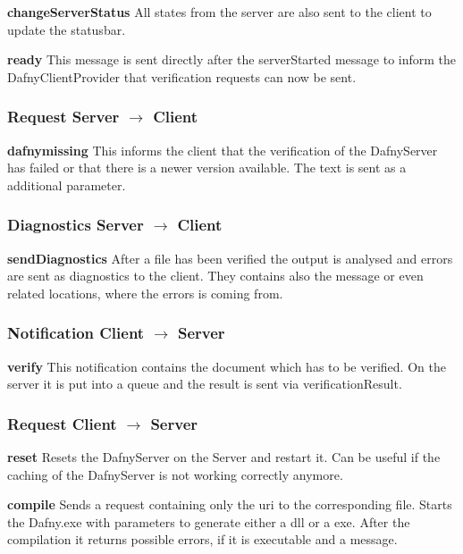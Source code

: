 \textbf{changeServerStatus}
All states from the server are also sent to the client to update the statusbar. \newline

\textbf{ready}
This message is sent directly after the serverStarted message to inform the DafnyClientProvider that verification requests can now be sent. \newline

\subsubsection{Request Server $\longrightarrow$ Client}

\textbf{dafnymissing}
This informs the client that the verification of the DafnyServer has failed or that there is a newer version available. The text is sent as a additional parameter.  \newline

\subsubsection{Diagnostics Server $\longrightarrow$ Client}

\textbf{sendDiagnostics}
After a file has been verified the output is analysed and errors are sent as diagnostics to the client. They contains also the message or even related locations, where the errors is coming from.  \newline

\subsubsection{Notification Client $\longrightarrow$ Server}

\textbf{verify}
This notification contains the document which has to be verified. On the server it is put into a queue and the result is sent via verificationResult. \newline

\subsubsection{Request Client $\longrightarrow$ Server}

\textbf{reset}
Resets the DafnyServer on the Server and restart it. Can be useful if the caching of the DafnyServer is not working correctly anymore. \newline

\textbf{compile}
Sends a request containing only the uri to the corresponding file. Starts the Dafny.exe with parameters to generate either a dll or a exe. After the compilation it returns possible errors, if it is executable and a message.\newline

